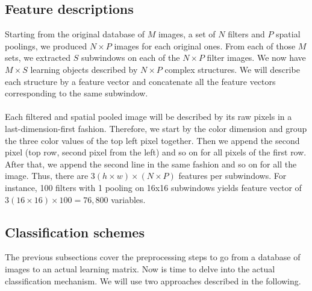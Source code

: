 \documentclass[a4paper]{report}
\begin{document}
		\subsection{Feature descriptions}		
		Starting from the original database of $M$ images, a set of $N$ filters and $P$ spatial poolings, we produced $N \times P$ images for each original ones. From each of those $M$ sets, we extracted $S$ subwindows on each of the $N \times P$ filter images. We now have $M \times S$ learning objects described by $N \times P$ complex structures. We will describe each structure by a feature vector and concatenate all the feature vectors corresponding to the same subwindow.
		\paragraph{}
		Each filtered and spatial pooled image will be described by its raw pixels in a last-dimension-first fashion. Therefore, we start by the color dimension and group the three color values of the top left pixel together. Then we append the second pixel (top row, second pixel from the left) and so on for all pixels of the first row. After that, we append the second line in the same fashion and so on for all the image.
		Thus, there are $3(h \times w) \times (N \times P)$ features per subwindows. For instance, 100 filters with 1 pooling on 16x16 subwindows yields feature vector of $3(16 \times 16) \times 100 = 76,800$ variables.
		
		\subsection{Classification schemes}
		The previous subsections cover the preprocessing steps to go from a database of images to an actual learning matrix. Now is time to delve into the actual classification mechanism. We will use two approaches described in the following. 
		
\end{document}
